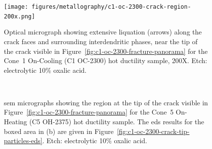 {\begin{figure}
    \centering
    \texttt{[image: figures/metallography/c1-oc-2300-crack-region-200x.png]}
    \caption[]{Optical micrograph showing extensive liquation (arrows) along the crack faces and surrounding interdendritic phases, near the tip of the crack visible in Figure~\ref{fig:c1-oc-2300-fracture-panorama} for the Cone~1 On-Cooling \protect{} (C1 OC-2300) hot ductility sample, 200X. Etch: electrolytic 10\% oxalic acid.}
    \label{fig:c1-oc-2300-crack-region-200x}
\end{figure}

\begin{figure}
    \centering
     \\
    \caption{\Gls{sem} micrographs showing the region at the tip of the crack visible in Figure~\ref{fig:c1-oc-2300-fracture-panorama} for the Cone~5 On-Heating \protect{} (C5 OH-2375) hot ductility sample. The \gls{eds} results for the boxed area in (b) are given in Figure~\ref{fig:c1-oc-2300-crack-tip-particles-eds}. Etch: electrolytic 10\% oxalic acid.}
    \label{fig:c1-oc-2300-crack-sem}
\end{figure}

}
